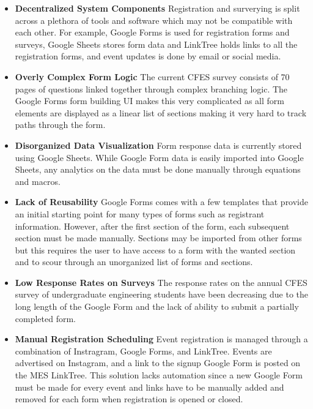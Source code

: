 \documentclass[12pt]{article}
\begin{document}
\begin{itemize}
  \item \textbf{Decentralized System Components} Registration and surverying is split across a plethora of tools and software which may not be compatible with each other. For example, Google Forms is used for registration forms and surveys, Google Sheets stores form data and LinkTree holds links to all the registration forms, and event updates is done by email or social media.
  \item \textbf{Overly Complex Form Logic} The current CFES survey consists of 70 pages of questions linked together through complex branching logic. The Google Forms form building UI makes this very complicated as all form elements are displayed as a linear list of sections making it very hard to track paths through the form.
  \item \textbf{Disorganized Data Visualization} Form response data is currently stored using Google Sheets. While Google Form data is easily imported into Google Sheets, any analytics on the data must be done manually through equations and macros.
  \item \textbf{Lack of Reusability} Google Forms comes with a few templates that provide an initial starting point for many types of forms such as registrant information. However, after the first section of the form, each subsequent section must be made manually. Sections may be imported from other forms but this requires the user to have access to a form with the wanted section and to scour through an unorganized list of forms and sections.
  \item \textbf{Low Response Rates on Surveys} The response rates on the annual CFES survey of undergraduate engineering students have been decreasing due to the long length of the Google Form and the lack of ability to submit a partially completed form.
  \item \textbf{Manual Registration Scheduling} Event registration is managed through a combination of Instragram, Google Forms, and LinkTree. Events are advertised on Instagram, and a link to the signup Google Form is posted on the MES LinkTree. This solution lacks automation since a new Google Form must be made for every event and links have to be manually added and removed for each form when registration is opened or closed.
\end{itemize}
%
\end{document}
